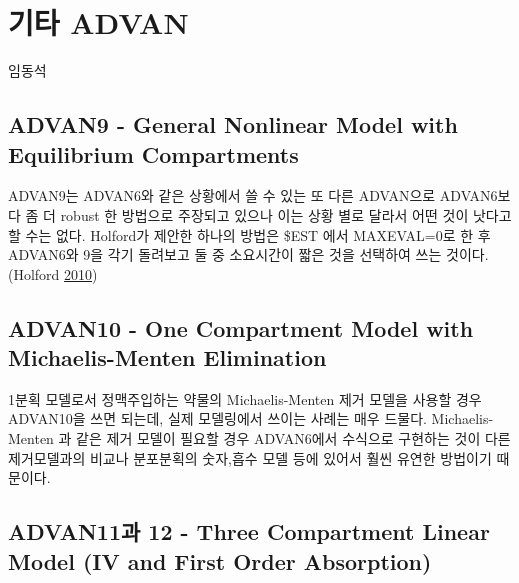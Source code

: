 \documentclass[
  11pt,
  krantz2,
  a4paper]{krantz}
\theoremstyle{definition}
\theoremstyle{definition}
\theoremstyle{definition}
\theoremstyle{remark}
\begin{document}
\hypertarget{newer-advan}{%
\chapter{기타 ADVAN}\label{newer-advan}}

\Large\hfill

임동석
\normalsize

\hypertarget{advan9---general-nonlinear-model-with-equilibrium-compartments}{%
\section{ADVAN9 - General Nonlinear Model with Equilibrium Compartments}\label{advan9---general-nonlinear-model-with-equilibrium-compartments}}


ADVAN9는 ADVAN6와 같은 상황에서 쓸 수 있는 또 다른 ADVAN으로 ADVAN6보다 좀 더 robust 한 방법으로 주장되고 있으나 이는 상황 별로 달라서 어떤 것이 낫다고 할 수는 없다. Holford가 제안한 하나의 방법은 \$EST 에서 MAXEVAL=0로 한 후 ADVAN6와 9을 각기 돌려보고 둘 중 소요시간이 짧은 것을 선택하여 쓰는 것이다. (Holford \protect\hyperlink{ref-nickholford}{2010})

\hypertarget{advan10---one-compartment-model-with-michaelis-menten-elimination}{%
\section{ADVAN10 - One Compartment Model with Michaelis-Menten Elimination}\label{advan10---one-compartment-model-with-michaelis-menten-elimination}}


1분획 모델로서 정맥주입하는 약물의 Michaelis-Menten 제거 모델을 사용할 경우 ADVAN10을 쓰면 되는데, 실제 모델링에서 쓰이는 사례는 매우 드물다. Michaelis-Menten 과 같은 제거 모델이 필요할 경우 ADVAN6에서 수식으로 구현하는 것이 다른 제거모델과의 비교나 분포분획의 숫자,흡수 모델 등에 있어서 훨씬 유연한 방법이기 때문이다.

\hypertarget{advan11uxacfc-12---three-compartment-linear-model-iv-and-first-order-absorption}{%
\section{ADVAN11과 12 - Three Compartment Linear Model (IV and First Order Absorption)}\label{advan11uxacfc-12---three-compartment-linear-model-iv-and-first-order-absorption}}
\end{document}
